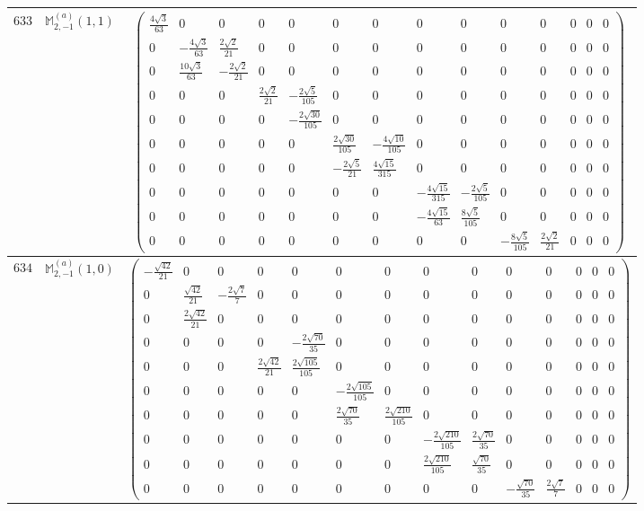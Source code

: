 \documentclass[fleqn,8pt,landscape]{jsarticle}
\begin{document}
\begin{center}
\begin{longtable}{ccc}
$ 633 $ & $ \mathbb{M}_{2,-1}^{(a)}(1,1) $ & $ \begin{pmatrix} \frac{4 \sqrt{3}}{63} & 0 & 0 & 0 & 0 & 0 & 0 & 0 & 0 & 0 & 0 & 0 & 0 & 0 \\ 0 & - \frac{4 \sqrt{3}}{63} & \frac{2 \sqrt{2}}{21} & 0 & 0 & 0 & 0 & 0 & 0 & 0 & 0 & 0 & 0 & 0 \\ 0 & \frac{10 \sqrt{3}}{63} & - \frac{2 \sqrt{2}}{21} & 0 & 0 & 0 & 0 & 0 & 0 & 0 & 0 & 0 & 0 & 0 \\ 0 & 0 & 0 & \frac{2 \sqrt{2}}{21} & - \frac{2 \sqrt{5}}{105} & 0 & 0 & 0 & 0 & 0 & 0 & 0 & 0 & 0 \\ 0 & 0 & 0 & 0 & - \frac{2 \sqrt{30}}{105} & 0 & 0 & 0 & 0 & 0 & 0 & 0 & 0 & 0 \\ 0 & 0 & 0 & 0 & 0 & \frac{2 \sqrt{30}}{105} & - \frac{4 \sqrt{10}}{105} & 0 & 0 & 0 & 0 & 0 & 0 & 0 \\ 0 & 0 & 0 & 0 & 0 & - \frac{2 \sqrt{5}}{21} & \frac{4 \sqrt{15}}{315} & 0 & 0 & 0 & 0 & 0 & 0 & 0 \\ 0 & 0 & 0 & 0 & 0 & 0 & 0 & - \frac{4 \sqrt{15}}{315} & - \frac{2 \sqrt{5}}{105} & 0 & 0 & 0 & 0 & 0 \\ 0 & 0 & 0 & 0 & 0 & 0 & 0 & - \frac{4 \sqrt{15}}{63} & \frac{8 \sqrt{5}}{105} & 0 & 0 & 0 & 0 & 0 \\ 0 & 0 & 0 & 0 & 0 & 0 & 0 & 0 & 0 & - \frac{8 \sqrt{5}}{105} & \frac{2 \sqrt{2}}{21} & 0 & 0 & 0 \end{pmatrix} $ \\ \hline
$ 634 $ & $ \mathbb{M}_{2,-1}^{(a)}(1,0) $ & $ \begin{pmatrix} - \frac{\sqrt{42}}{21} & 0 & 0 & 0 & 0 & 0 & 0 & 0 & 0 & 0 & 0 & 0 & 0 & 0 \\ 0 & \frac{\sqrt{42}}{21} & - \frac{2 \sqrt{7}}{7} & 0 & 0 & 0 & 0 & 0 & 0 & 0 & 0 & 0 & 0 & 0 \\ 0 & \frac{2 \sqrt{42}}{21} & 0 & 0 & 0 & 0 & 0 & 0 & 0 & 0 & 0 & 0 & 0 & 0 \\ 0 & 0 & 0 & 0 & - \frac{2 \sqrt{70}}{35} & 0 & 0 & 0 & 0 & 0 & 0 & 0 & 0 & 0 \\ 0 & 0 & 0 & \frac{2 \sqrt{42}}{21} & \frac{2 \sqrt{105}}{105} & 0 & 0 & 0 & 0 & 0 & 0 & 0 & 0 & 0 \\ 0 & 0 & 0 & 0 & 0 & - \frac{2 \sqrt{105}}{105} & 0 & 0 & 0 & 0 & 0 & 0 & 0 & 0 \\ 0 & 0 & 0 & 0 & 0 & \frac{2 \sqrt{70}}{35} & \frac{2 \sqrt{210}}{105} & 0 & 0 & 0 & 0 & 0 & 0 & 0 \\ 0 & 0 & 0 & 0 & 0 & 0 & 0 & - \frac{2 \sqrt{210}}{105} & \frac{2 \sqrt{70}}{35} & 0 & 0 & 0 & 0 & 0 \\ 0 & 0 & 0 & 0 & 0 & 0 & 0 & \frac{2 \sqrt{210}}{105} & \frac{\sqrt{70}}{35} & 0 & 0 & 0 & 0 & 0 \\ 0 & 0 & 0 & 0 & 0 & 0 & 0 & 0 & 0 & - \frac{\sqrt{70}}{35} & \frac{2 \sqrt{7}}{7} & 0 & 0 & 0 \end{pmatrix} $ \\ \hline

\end{longtable}
\end{center}
\end{document}

